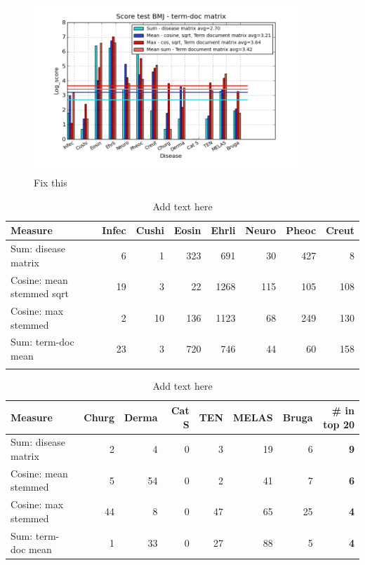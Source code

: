 \begin{figure}[H]
        \begin{center}
          \includegraphics[width=0.9\textwidth]{barcharts/termDoc_bmj_hist_3000_sum_dm_mea_cos_sqrt_td_max_cos_sqrt_td_mea_sum_td.png}
        \end{center}
        \caption{Fix this}
        \label{termDoc_bmj_hist_3000_sum_dm_mea_cos_sqrt_td_max_cos_sqrt_td_mea_sum_td}
\end{figure}

\begin{table}[H]
  \begin{tiny}
  \caption{Add text here}
  \label{testResult}
  \begin{tabular}{|l|r|r|r|r|r|r|r|}
    \hline
    Measure &Infec&Cushi&Eosin&Ehrli&Neuro&Pheoc&Creut \\
    \hline
    Sum: disease matrix &6&1&323&691&30&427&8 \\
    \hline
    Cosine: mean stemmed sqrt &19&3&22&1268&115&105&108 \\
    \hline
    Cosine: max stemmed &2&10&136&1123&68&249&130 \\
    \hline
    Sum: term-doc mean &23&3&720&746&44&60&158 \\
    \hline
  \multicolumn{8}{c}{} \\
  \end{tabular}
  \begin{tabular}{|l|r|r|r|r|r|r|r|}
    \hline
    Measure &Churg&Derma&Cat S&TEN&MELAS&Bruga& \scriptsize{\textbf{\# in top 20}} \\
    \hline
    Sum: disease matrix &2&4&0&3&19&6 &\scriptsize{\textbf{9}} \\
    \hline
    Cosine: mean stemmed &5&54&0&2&41&7 &\scriptsize{\textbf{6}}\\
    \hline
    Cosine: max stemmed &44&8&0&47&65&25 & \scriptsize{\textbf{4}} \\
    \hline
    Sum: term-doc mean &1&33&0&27&88&5 & \scriptsize{\textbf{4}} \\
    \hline
  \end{tabular}
  \end{tiny}
\end{table}

